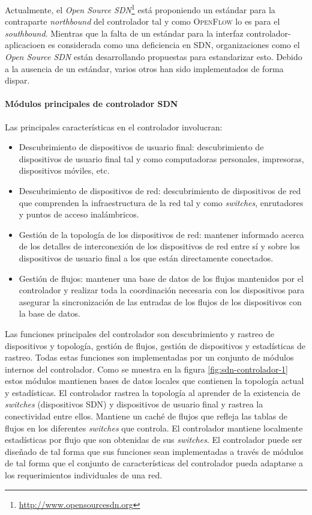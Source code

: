 \documentclass[10pt,journal,compsoc]{IEEEtran}
\begin{document}
Actualmente, el \emph{Open Source SDN}\footnote{\url{http://www.opensourcesdn.org}} está proponiendo un estándar para la contraparte \emph{northbound} del controlador tal y como \textsc{OpenFlow} lo es para el \emph{southbound}. Mientras que la falta de un estándar para la interfaz controlador-aplicacioen es considerada como una deficiencia en SDN, organizaciones como el \emph{Open Source SDN} están desarrollando propuestas para estandarizar esto. Debido a la ausencia de un estándar, varios otros han sido implementados de forma dispar.

\paragraph{Módulos principales de controlador SDN}
Las principales características en el controlador involucran:
\begin{itemize}
    \item Descubrimiento de dispositivos de usuario final: descubrimiento de dispositivos de usuario final tal y como computadoras personales, impresoras, dispositivos móviles, etc.
    \item Descubrimiento de dispositivos de red: descubrimiento de dispositivos de red que comprenden la infraestructura de la red tal y como \emph{switches}, enrutadores y puntos de acceso inalámbricos.
    \item Gestión de la topología de los dispositivos de red: mantener informado acerca de los detalles de interconexión de los dispositivos de red entre sí y sobre los dispositivos de usuario final a los que están directamente conectados.
    \item Gestión de flujos: mantener una base de datos de los flujos mantenidos por el controlador y realizar toda la coordinación necesaria con los dispositivos para asegurar la sincronización de las entradas de los flujos de los dispositivos con la base de datos.
\end{itemize}

Las funciones principales del controlador son descubrimiento y rastreo de dispositivos y topología, gestión de flujos, gestión de dispositivos y estadísticas de rastreo. Todas estas funciones son implementadas por un conjunto de módulos internos del controlador. Como se muestra en la figura \ref{fig:sdn-controlador-1} estos módulos mantienen bases de datos locales que contienen la topología actual y estadísticas. El controlador rastrea la topología al aprender de la existencia de \emph{switches} (dispositivos SDN) y dispositivos de usuario final y rastrea la conectividad entre ellos. Mantiene un caché de flujos que refleja las tablas de flujos en los diferentes \emph{switches} que controla. El controlador mantiene localmente estadísticas por flujo que son obtenidas de sus \emph{switches}. El controlador puede ser diseñado de tal forma que sus funciones sean implementadas a través de módulos de tal forma que el conjunto de características del controlador pueda adaptarse a los requerimientos individuales de una red.
\end{document}
